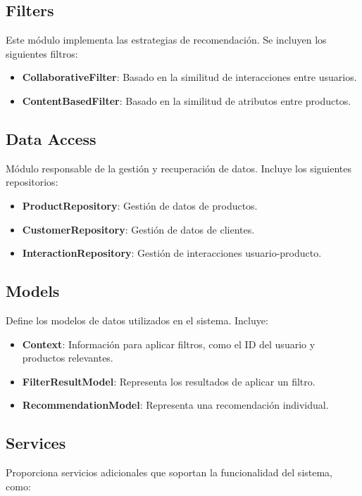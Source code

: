 \documentclass{llncs}
\begin{document}
\subsection{Filters}
Este módulo implementa las estrategias de recomendación. Se incluyen los siguientes filtros:

\begin{itemize}
    \item \textbf{CollaborativeFilter}: Basado en la similitud de interacciones entre usuarios.
    \item \textbf{ContentBasedFilter}: Basado en la similitud de atributos entre productos.
\end{itemize}

\subsection{Data Access}
Módulo responsable de la gestión y recuperación de datos. Incluye los siguientes repositorios:

\begin{itemize}
    \item \textbf{ProductRepository}: Gestión de datos de productos.
    \item \textbf{CustomerRepository}: Gestión de datos de clientes.
    \item \textbf{InteractionRepository}: Gestión de interacciones usuario-producto.
\end{itemize}

\subsection{Models}
Define los modelos de datos utilizados en el sistema. Incluye:

\begin{itemize}
    \item \textbf{Context}: Información para aplicar filtros, como el ID del usuario y productos relevantes.
    \item \textbf{FilterResultModel}: Representa los resultados de aplicar un filtro.
    \item \textbf{RecommendationModel}: Representa una recomendación individual.
\end{itemize}

\subsection{Services}
Proporciona servicios adicionales que soportan la funcionalidad del sistema, como:
\end{document}
